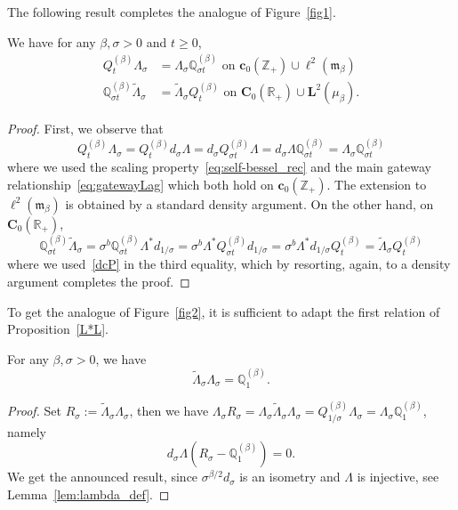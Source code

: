 \documentclass[AHL,Unicode,longabstracts]{cedram}
\newcommand{\df}{\mathrel{:=}}
\newcommand{\RR}{\mathbb{R}}
\newcommand{\ZZ}{\mathbb{Z}}
\newcommand{\fm}{\mathfrak{m}}
\newcommand{\wi}{\widetilde}
\newcommand{\dBs}{{\discret{Q}}}
\newcommand{\Bs}{Q}
\newcommand{\esL}{\mathbf{L}}
\newcommand{\esC}{\mathbf{C}}
\newcommand{\esc}{\mathbf{c}}
\newcommand{\discret}[1]{\mathds{#1}}
\newcommand{\cont}[1]{{#1}}
\newcommand{\adjL}{\Lambda^*}
\begin{document}
The following result completes the analogue of Figure~\ref{fig1}.
\begin{lemm}\label{cinter}
We have for any $\beta,\sigma>0$ and $t\geq 0$,
\begin{align*}
\Bs_t^{(\beta)}\Lambda_{\sigma}&=\Lambda_{\sigma} \dBs_{\sigma t}^{(\beta)} \text{ on $\esc_0(\ZZ_+) \cup \ell^2({\fm_{\beta}})$}\\
\dBs_{\sigma t}^{(\beta)}\wi\Lambda_{\sigma}&=\wi\Lambda_{\sigma} \Bs_{t}^{(\beta)} \text{ on $\esC_0(\RR_+) \cup \esL^2(\mu_\beta)$}.
\end{align*}
\end{lemm}
\begin{proof}
First, we observe that
\[
\Bs_t^{(\beta)}\Lambda_{\sigma}=\Bs_t^{(\beta)} d_\sigma \Lambda=d_\sigma \Bs_{\sigma t}^{(\beta)} \Lambda=d_\sigma \Lambda \dBs_{\sigma t}^{(\beta)} =\Lambda_{\sigma} \dBs_{\sigma t}^{(\beta)}
\]
where we used the scaling property~\eqref{eq:self-bessel_rec} and the main gateway relationship~\eqref{eq:gatewayLag} which both hold on $\esc_0(\ZZ_+)$. The extension to $\ell^2({\fm_{\beta}})$ is obtained by a standard density argument. On the other hand, on $\esC_0(\RR_+)$,
\[
\dBs_{\sigma t}^{(\beta)}\wi\Lambda_{\sigma}=\sigma^b\dBs_{\sigma t}^{(\beta)}\adjL \cont{d}_{1/\sigma}=\sigma^b\adjL \Bs_{\sigma t}^{(\beta)} \cont{d}_{1/\sigma}=\sigma^b\adjL \cont{d}_{1/\sigma} \Bs_{t}^{(\beta)}=\wi\Lambda_{\sigma} \Bs_{t}^{(\beta)}
\]
where we used~\eqref{dcP} in the third equality, which by resorting, again, to a density argument completes the proof.
\end{proof}

To get the analogue of Figure~\ref{fig2}, it is sufficient to adapt the first relation of Proposition~\ref{L*L}.
\begin{lemm}\label{LcLc}
For any $\beta,\sigma>0$, we have
\[
\wi\Lambda_{\sigma}\Lambda_{\sigma}=\dBs^{(\beta)}_{1}.
\]
\end{lemm}
\begin{proof}
Set $R_{\sigma}\df \wi\Lambda_{\sigma}\Lambda_{\sigma}$, then we have $\Lambda_{\sigma}R_{\sigma}=\Lambda_{\sigma}\wi\Lambda_{\sigma}\Lambda_{\sigma}=\Bs_{1/\sigma}^{(\beta)}\Lambda_{\sigma}=\Lambda_{\sigma} \dBs_{1}^{(\beta)}$, namely
\[
d_\sigma\Lambda(R_{\sigma}-\dBs_{1}^{(\beta)})=0.
\]
We get the announced result, since $\sigma^{\beta/2}d_\sigma$ is an isometry and $\Lambda$ is injective, see Lemma~\ref{lem:lambda_def}.
\end{proof}
\end{document}
